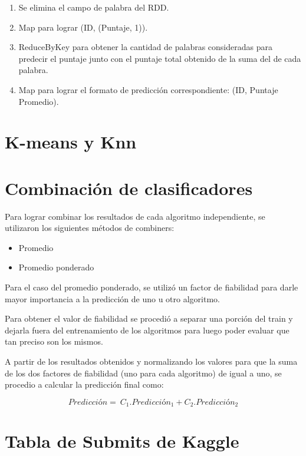\documentclass[a4paper,11pt]{report}
\begin{document}
\begin{enumerate}[1.]
    \item Se elimina el campo de palabra del RDD.
    
    \item Map para lograr (ID, (Puntaje, 1)).
    
    \item ReduceByKey para obtener la cantidad de palabras consideradas para predecir el puntaje junto con el puntaje total obtenido de la suma del de cada palabra.
    
    \item Map para lograr el formato de predicción correspondiente: (ID, Puntaje Promedio).
    
\end{enumerate}

\chapter{K-means y Knn}


\chapter{Combinación de clasificadores}

Para lograr combinar los resultados de cada algoritmo independiente, se utilizaron los siguientes métodos de combiners:

\begin{itemize}
    \item Promedio
    \item Promedio ponderado
\end{itemize} 

Para el caso del promedio ponderado, se utilizó un factor de fiabilidad para darle mayor importancia a la predicción de uno u otro algoritmo.

Para obtener el valor de fiabilidad se procedió a separar una porción del train y dejarla fuera del entrenamiento de los algoritmos para luego poder evaluar que tan preciso son los mismos. 

A partir de los resultados obtenidos y normalizando los valores para que la suma de los dos factores de fiabilidad (uno para cada algoritmo) de igual a uno, se procedio a calcular la predicción final como:

\[ Predicción = \ C_{1} . Predicción_{1} + C_{2} . Predicción_{2} \]


\chapter{Tabla de Submits de Kaggle}
\end{document}
